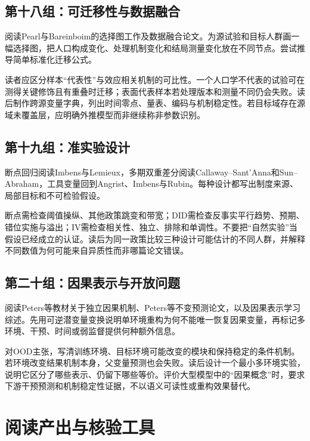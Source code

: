 \subsection*{第十八组：可迁移性与数据融合}

阅读Pearl与Bareinboim的选择图工作及数据融合论文\parencite{pearlbareinboim2014,bareinboimpearl2016}。为源试验和目标人群画一幅选择图，把人口构成变化、处理机制变化和结局测量变化放在不同节点。尝试推导简单标准化迁移公式。

读者应区分样本“代表性”与效应相关机制的可比性。一个人口学不代表的试验可在测得关键修饰且有重叠时迁移；表面代表样本若处理版本和测量不同仍会失败。读后制作跨源变量字典，列出时间零点、量表、编码与机制稳定性。若目标域存在源域未覆盖层，应明确外推模型而非继续称非参数识别。

\subsection*{第十九组：准实验设计}

断点回归阅读Imbens与Lemieux，多期双重差分阅读Callaway--Sant'Anna和Sun--Abraham，工具变量回到Angrist、Imbens与Rubin\parencite{imbenslemieux2008,callawaysantanna2021,sunabraham2021,angrist1996}。每种设计都写出制度来源、局部目标和不可检验假设。

断点需检查阈值操纵、其他政策跳变和带宽；DID需检查反事实平行趋势、预期、错位实施与溢出；IV需检查相关性、独立、排除和单调性。不要把“自然实验”当假设已经成立的认证。读后为同一政策比较三种设计可能估计的不同人群，并解释不同数值为何可能来自异质性而非哪篇论文错误。

\subsection*{第二十组：因果表示与开放问题}

阅读Peters等教材关于独立因果机制、Peters等不变预测论文，以及因果表示学习综述\parencite{peters2017,peters2016,scholkopf2021}。先用可逆潜变量变换说明单环境重构为何不能唯一恢复因果变量，再标记多环境、干预、时间或弱监督提供何种额外信息。

对OOD主张，写清训练环境、目标环境可能改变的模块和保持稳定的条件机制。若环境改变结果机制本身，父变量预测也会失败。读后设计一个最小多环境实验，说明它区分了哪些表示、仍留下哪些等价。评价大型模型中的“因果概念”时，要求下游干预预测和机制稳定性证据，不以语义可读性或重构效果替代。

\section{阅读产出与核验工具}

